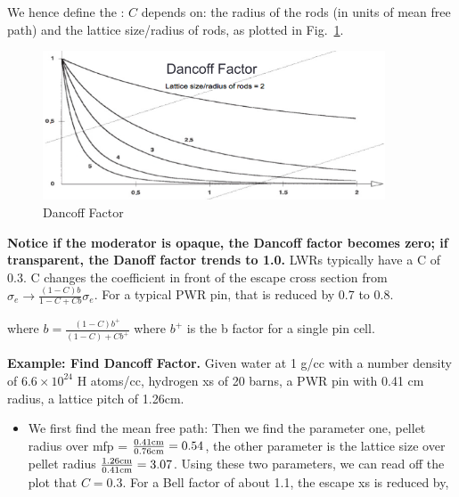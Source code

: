 \documentclass{school-22.211-notes}
\begin{document}
We hence define the :
$C$ depends on: the radius of the rods (in units of mean free path) and the lattice size/radius of rods, as plotted in Fig.~\ref{dancoff}. 
\begin{figure}[ht]
  \centering
  \includegraphics[width=4in]{images/r-m/dancoff.png}
  \caption{Dancoff Factor} \label{dancoff}
\end{figure}
\textbf{Notice if the moderator is opaque, the Dancoff factor becomes zero; if transparent, the Danoff factor trends to 1.0.}  LWRs typically have a C of 0.3. 
C changes the coefficient in front of the escape cross section from $\sigma_e \to \frac{(1-C)b}{1-C + Cb} \sigma_e$. For a typical PWR pin, that is reduced by 0.7 to 0.8.


where $b = \frac{(1-C)b^+}{(1-C) + C b^+}$ where $b^+$ is the b factor for a single pin cell. 

\textbf{Example: Find Dancoff Factor.} Given water at 1 g/cc with a number density of $6.6 \times 10^{24}$ H atoms/cc, hydrogen xs of 20 barns, a PWR pin with 0.41 cm radius, a lattice pitch of 1.26cm. 
\begin{itemize}
\item We first find the mean free path: 
Then we find the parameter one, pellet radius over mfp = $\frac{0.41 \mathrm{cm}}{0.76 \mathrm{cm}}  = 0.54$, the other parameter is the lattice size over pellet radius $\frac{1.26 \mathrm{cm}}{0.41 \mathrm{cm}} = 3.07$. Using these two parameters, we can read off the plot that $C = 0.3$. For a Bell factor of about 1.1, the escape xs is reduced by,
\end{itemize}
\end{document}
